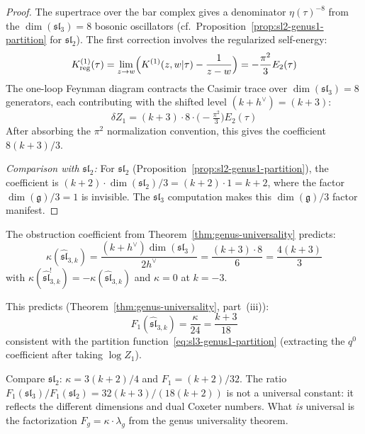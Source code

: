 \begin{proof}
The supertrace over the bar complex gives a denominator $\eta(\tau)^{-8}$ from the $\dim(\mathfrak{sl}_3) = 8$ bosonic oscillators (cf.\ Proposition~\ref{prop:sl2-genus1-partition} for $\mathfrak{sl}_2$).  The first correction involves the regularized self-energy:
\begin{equation}
K^{(1)}_{\mathrm{reg}}(\tau) = \lim_{z \to w}\Bigl(K^{(1)}(z,w|\tau) - \frac{1}{z-w}\Bigr) = -\frac{\pi^2}{3} E_2(\tau)
\end{equation}
The one-loop Feynman diagram contracts the Casimir trace over $\dim(\mathfrak{sl}_3) = 8$ generators, each contributing with the shifted level $(k+h^\vee) = (k+3)$:
\begin{equation}
\delta Z_1 = (k+3) \cdot 8 \cdot \bigl(-\tfrac{\pi^2}{3}\bigr) E_2(\tau)
\end{equation}
After absorbing the $\pi^2$ normalization convention, this gives the coefficient $8(k+3)/3$.

\emph{Comparison with $\mathfrak{sl}_2$:} For $\mathfrak{sl}_2$ (Proposition~\ref{prop:sl2-genus1-partition}), the coefficient is $(k+2) \cdot \dim(\mathfrak{sl}_2)/3 = (k+2) \cdot 1 = k+2$, where the factor $\dim(\mathfrak{g})/3 = 1$ is invisible.  The $\mathfrak{sl}_3$ computation makes this $\dim(\mathfrak{g})/3$ factor manifest.
\end{proof}

\begin{remark}\label{rem:sl3-universality}
The obstruction coefficient from Theorem~\ref{thm:genus-universality} predicts:
\begin{equation}
\kappa(\widehat{\mathfrak{sl}}_{3,k}) = \frac{(k+h^\vee)\dim(\mathfrak{sl}_3)}{2h^\vee} = \frac{(k+3) \cdot 8}{6} = \frac{4(k+3)}{3}
\end{equation}
with $\kappa(\widehat{\mathfrak{sl}}_{3,k}^!) = -\kappa(\widehat{\mathfrak{sl}}_{3,k})$ and $\kappa = 0$ at $k = -3$.

This predicts (Theorem~\ref{thm:genus-universality}, part~(iii)):
\begin{equation}
F_1(\widehat{\mathfrak{sl}}_{3,k}) = \frac{\kappa}{24} = \frac{k+3}{18}
\end{equation}
consistent with the partition function~\eqref{eq:sl3-genus1-partition} (extracting the $q^0$ coefficient after taking $\log Z_1$).

Compare $\mathfrak{sl}_2$: $\kappa = 3(k+2)/4$ and $F_1 = (k+2)/32$.  The ratio $F_1(\mathfrak{sl}_3)/F_1(\mathfrak{sl}_2) = 32(k+3)/(18(k+2))$ is not a universal constant: it reflects the different dimensions and dual Coxeter numbers.  What \emph{is} universal is the factorization $F_g = \kappa \cdot \lambda_g$ from the genus universality theorem.
\end{remark}

